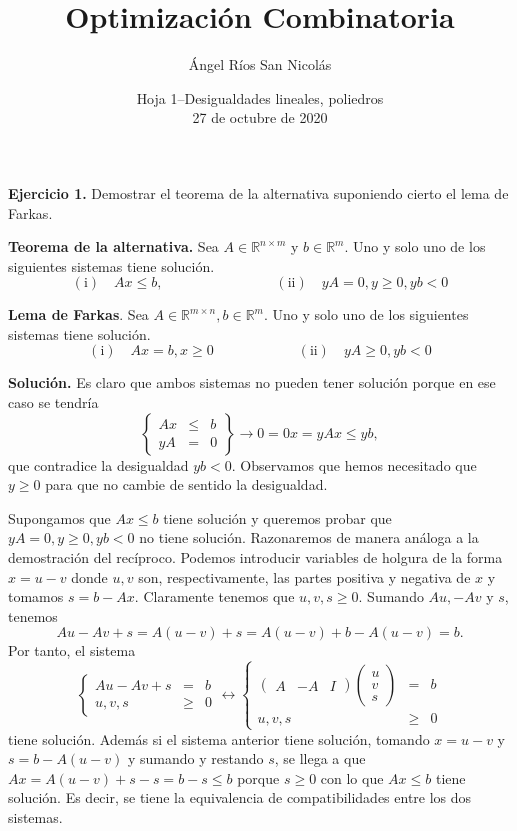 \documentclass[10pt,a4paper]{article}
\author{Ángel Ríos San Nicolás}
\title{Optimización Combinatoria}
\date{Hoja 1--Desigualdades lineales, poliedros\\ 27 de octubre de 2020}
\begin{document}
\maketitle
\textbf{Ejercicio 1.} Demostrar el teorema de la alternativa suponiendo cierto el lema de Farkas.

\textbf{Teorema de la alternativa.} Sea $A\in\mathbb{R}^{n\times m}$ y $b\in\mathbb{R}^m$. Uno y solo uno de los siguientes sistemas tiene solución.
$$
(\text{i})\quad Ax\leq b,\qquad\qquad\qquad\qquad (\text{ii})\quad yA=0, y\geq 0, yb<0$$


\textbf{Lema de Farkas}. Sea $A\in\mathbb{R}^{m\times n},b\in\mathbb{R}^m$. Uno y solo uno de los siguientes sistemas tiene solución.
$$
(\text{i})\quad Ax=b,x\geq 0\qquad\qquad\qquad (\text{ii})\quad yA\geq0, yb<0$$

\textbf{Solución.}
Es claro que ambos sistemas no pueden tener solución porque en ese caso se tendría
$$\left\{\begin{array}{ccc}Ax & \leq & b\\
yA & = & 0\end{array}\right\}\longrightarrow 0=0x=yAx\leq yb,$$
que contradice la desigualdad $yb<0$. Observamos que hemos necesitado que $y\geq 0$ para que no cambie de sentido la desigualdad.

Supongamos que $Ax\leq b$ tiene solución y queremos probar que $yA=0,y\geq 0,yb<0$ no tiene solución. Razonaremos de manera análoga a la demostración del recíproco. Podemos introducir variables de holgura de la forma $x=u-v$ donde $u,v$ son, respectivamente, las partes positiva y negativa de $x$ y tomamos $s=b-Ax$. Claramente tenemos que $u,v,s\geq 0$. Sumando $Au,-Av$ y $s$, tenemos
$$Au-Av+s=A(u-v)+s=A(u-v)+b-A(u-v)=b.$$
Por tanto, el sistema 
$$\left\{\begin{array}{rcl}
Au-Av+s & = & b\\
u,v,s & \geq & 0
\end{array} \right.\longleftrightarrow\left\{\begin{array}{rcl}
\begin{pmatrix}
A & -A & I
\end{pmatrix}\begin{pmatrix}
u\\v\\s
\end{pmatrix} & = & b\\
u,v,s & \geq & 0
\end{array} \right.$$
tiene solución. Además si el sistema anterior tiene solución, tomando $x=u-v$ y $s=b-A(u-v)$ y sumando y restando $s$, se llega a que $Ax=A(u-v)+s-s=b-s\leq b$ porque $s\geq 0$ con lo que $Ax\leq b$ tiene solución. Es decir, se tiene la equivalencia de compatibilidades entre los dos sistemas.
\end{document}
